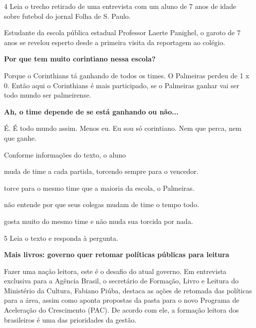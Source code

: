 \begin{myquote}
\begin{myescolha}
\num{4} Leia o trecho retirado de uma entrevista com um aluno de 7 anos
de idade sobre futebol do jornal Folha de S. Paulo.

\begin{myquote}
Estudante da escola pública estadual Professor Laerte Panighel, o garoto
de 7 anos se revelou esperto desde a primeira visita da reportagem ao
colégio.

\textbf{Por que tem muito corintiano nessa escola?}

Porque o Corinthians tá ganhando de todos os times. O Palmeiras perdeu
de 1 x 0. Então aqui o Corinthians é mais participado, se o
Palmeiras ganhar vai ser todo mundo ser palmeirense.

\textbf{Ah, o time depende de se está ganhando ou não...}

É. É todo mundo assim. Menos eu. Eu sou só corintiano. Nem que perca,
nem que ganhe.

\end{myquote}

Conforme informações do texto, o aluno

\begin{escolha}
\item muda de time a cada partida, torcendo sempre para o vencedor.

\item torce para o mesmo time que a maioria da escola, o Palmeiras.

\item não entende por que seus colegas mudam de time o tempo todo.

\item gosta muito do mesmo time e não muda sua torcida por nada.
\end{escolha}



\num{5} Leia o texto e responda à pergunta.

\begin{myquote}
\textbf{Mais livros: governo quer retomar políticas públicas para leitura}

Fazer uma nação leitora, este é o desafio do atual governo. Em
entrevista exclusiva para a Agência Brasil, o secretário de Formação,
Livro e Leitura do Ministério da Cultura, Fabiano Piúba, destaca as
ações de retomada das políticas para a área, assim como aponta propostas
da pasta para o novo Programa de Aceleração do Crescimento (PAC). De
acordo com ele, a formação leitora dos brasileiros é uma das prioridades
da gestão.


\end{myquote}
\end{myescolha}
\end{myquote}
